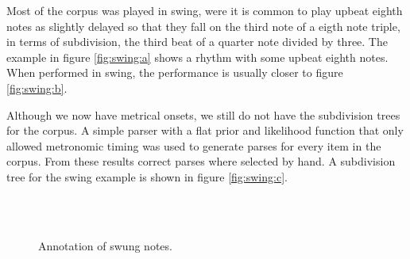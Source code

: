Most of the corpus was played in swing, were it is common to play upbeat eighth notes as slightly delayed so that they fall on the third note of a eigth note triple, in terms of subdivision, the third beat of a quarter note divided by three. The example in figure \ref{fig:swing:a} shows a rhythm with some upbeat eighth notes. When performed in swing, the performance is usually closer to figure \ref{fig:swing:b}.

Although we now have metrical onsets, we still do not have the subdivision trees for the corpus. A simple parser with a flat prior and likelihood function that only allowed metronomic timing was used to generate parses for every item in the corpus. From these results correct parses where selected by hand. A subdivision tree for the swing example is shown in figure \ref{fig:swing:c}.


\begin{figure}
\centering
{}
\\
\\
\caption{Annotation of swung notes.}
\end{figure}




